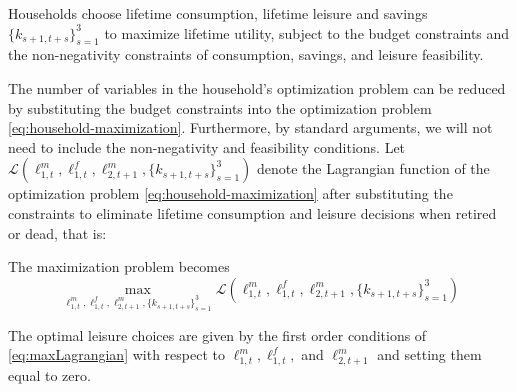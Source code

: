 \documentclass[ProjectUYA]{subfiles}
\begin{document}
Households choose lifetime consumption, lifetime leisure and savings $\{k_{s+1,t+s}\}_{s=1}^3$ to maximize lifetime utility, subject to the budget constraints and the non-negativity constraints of consumption, savings, and leisure feasibility. 


The number of variables in the household's optimization problem  can be reduced by substituting the budget constraints into the optimization problem \eqref{eq:household-maximization}. Furthermore, by standard arguments, we will not need to include the non-negativity and feasibility conditions. Let $\mathcal{L}(\ell_{1,t}^m,\ell_{1,t}^f,\ell_{2,t+1}^m,\{k_{s+1,t+s}\}_{s=1}^3)$ denote the Lagrangian function of the optimization problem \eqref{eq:household-maximization} after substituting the constraints to eliminate lifetime consumption and leisure decisions when retired or dead,  that is:




 The maximization problem becomes 
\begin{equation}
	\label{eq:maxLagrangian}
	\max_{\ell_{1,t}^m,\ell_{1,t}^f,\ell_{2,t+1}^m,\{k_{s+1,t+s}\}_{s=1}^3} \mathcal{L}(\ell_{1,t}^m,\ell_{1,t}^f,\ell_{2,t+1}^m,\{k_{s+1,t+s}\}_{s=1}^3)
\end{equation}

The optimal leisure choices are given by the first order conditions of \eqref{eq:maxLagrangian} with respect to $\ell_{1,t}^m,\ell_{1,t}^f,$ and $\ell_{2,t+1}^m$ and setting them equal to zero. 
\end{document}
